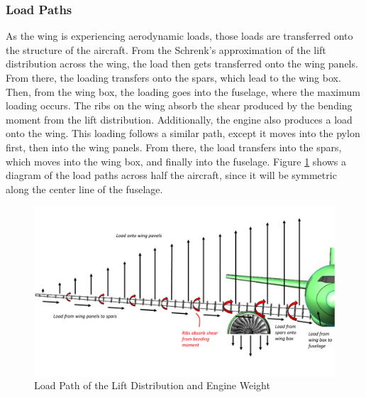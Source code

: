 \subsubsection{Load Paths}
As the wing is experiencing aerodynamic loads, those loads are transferred onto the structure of the aircraft. From the Schrenk's approximation of the lift distribution across the wing, the load then gets transferred onto the wing panels. From there, the loading transfers onto the spars, which lead to the wing box. Then, from the wing box, the loading goes into the fuselage, where the maximum loading occurs. The ribs on the wing absorb the shear produced by the bending moment from the lift distribution. Additionally, the engine also produces a load onto the wing. This loading follows a similar path, except it moves into the pylon first, then into the wing panels. From there, the load transfers into the spars, which moves into the wing box, and finally into the fuselage. Figure \ref{loadpath} shows a diagram of the load paths across half the aircraft, since it will be symmetric along the center line of the fuselage. 

\begin{figure}[H]
    \centering
    \includegraphics[width=1.0\linewidth]{Photos/Load_Path.pdf}
    \caption{Load Path of the Lift Distribution and Engine Weight}
    \label{loadpath}
\end{figure}

